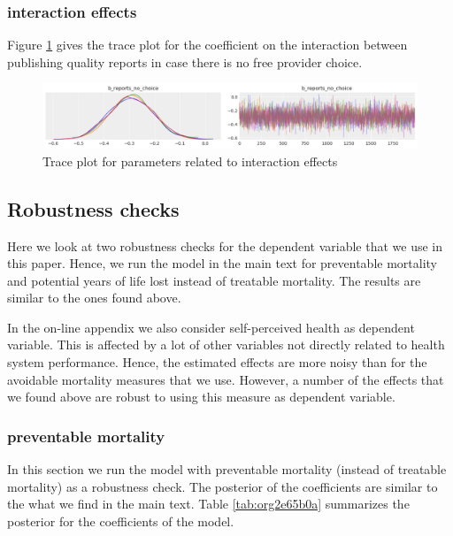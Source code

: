 \documentclass{article}
\begin{document}
\subsubsection{interaction effects}
\label{sec:org7bf23d5}

Figure \ref{fig:org3278d6e} gives the trace plot for the coefficient on the interaction between publishing quality reports in case there is no free provider choice.

\begin{figure}[htbp]
\centering
\includegraphics[width=.9\linewidth]{./figures/trace_interaction.png}
\caption{\label{fig:org3278d6e}Trace plot for parameters related to interaction effects}
\end{figure}



\subsection{Robustness checks}
\label{sec:orgbe57f6a}
\label{app:robustness}

Here we look at two robustness checks for the dependent variable that we use in this paper. Hence, we run the model in the main text for preventable mortality and potential years of life lost instead of treatable mortality. The results are similar to the ones found above.

In the on-line appendix we also consider self-perceived health as dependent variable. This is affected by a lot of other variables not directly related to health system performance. Hence, the estimated effects are more noisy than for the avoidable mortality measures that we use. However, a number  of the effects that we found above are robust to using this measure as dependent variable.

\subsubsection{preventable mortality}
\label{sec:orgc515c0c}

In this section we run the model with preventable mortality (instead of treatable mortality) as a robustness check. The posterior of the coefficients are similar to the what we find in the main text. Table \ref{tab:org2e65b0a} summarizes the posterior for the coefficients of the model.
\end{document}
